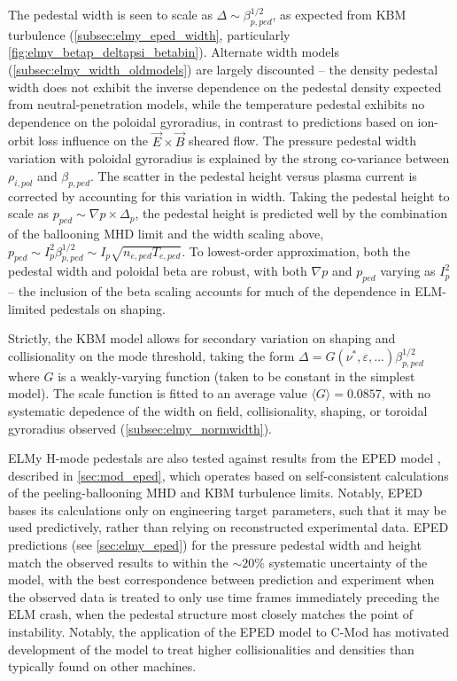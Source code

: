 The pedestal width is seen to scale as $\Delta \sim \beta_{p,ped}^{1/2}$, as expected from KBM turbulence (\cf \cref{subsec:elmy_eped_width}, particularly \cref{fig:elmy_betap_deltapsi_betabin}).  Alternate width models (\cref{subsec:elmy_width_oldmodels}) are largely discounted -- the density pedestal width does not exhibit the inverse dependence on the pedestal density expected from neutral-penetration models, while the temperature pedestal exhibits no dependence on the poloidal gyroradius, in contrast to predictions based on ion-orbit loss influence on the $\vec{E}\times\vec{B}$ sheared flow.  The pressure pedestal width variation with poloidal gyroradius is explained by the strong co-variance between $\rho_{i,pol}$ and $\beta_{p,ped}$.  The scatter in the pedestal height versus plasma current is corrected by accounting for this variation in width.  Taking the pedestal height to scale as $p_{ped} \sim \nabla p \times \Delta_p$, the pedestal height is predicted well by the combination of the ballooning MHD limit and the width scaling above, $p_{ped} \sim I_p^2 \beta_{p,ped}^{1/2} \sim I_p \sqrt{n_{e,ped} T_{e,ped}}$.  To lowest-order approximation, both the pedestal width and poloidal beta are robust, with both $\nabla p$ and $p_{ped}$ varying as $I_p^2$ -- the inclusion of the beta scaling accounts for much of the dependence in ELM-limited pedestals on shaping.

Strictly, the KBM model allows for secondary variation on shaping and collisionality on the mode threshold, taking the form $\Delta = G(\nu^*,\varepsilon,...) \beta_{p,ped}^{1/2}$ where $G$ is a weakly-varying function (taken to be constant in the simplest model).  The scale function is fitted to an average value $\langle G \rangle = 0.0857$, with no systematic depedence of the width on field, collisionality, shaping, or toroidal gyroradius observed (\cref{subsec:elmy_normwidth}).  

ELMy H-mode pedestals are also tested against results from the EPED model \cite{Snyder2011}, described in \cref{sec:mod_eped}, which operates based on self-consistent calculations of the peeling-ballooning MHD and KBM turbulence limits.  Notably, EPED bases its calculations only on engineering target parameters, such that it may be used predictively, rather than relying on reconstructed experimental data.  EPED predictions (see \cref{sec:elmy_eped}) for the pressure pedestal width and height match the observed results to within the $\sim 20\%$ systematic uncertainty of the model, with the best correspondence between prediction and experiment when the observed data is treated to only use time frames immediately preceding the ELM crash, when the pedestal structure most closely matches the point of instability.  Notably, the application of the EPED model to C-Mod has motivated development of the model to treat higher collisionalities and densities than typically found on other machines.\nicesectionending


